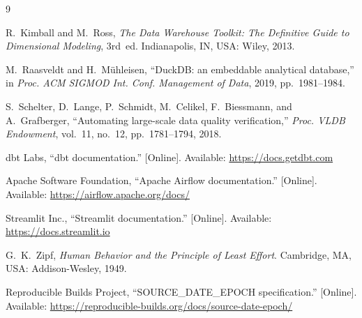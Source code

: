 \documentclass[conference]{IEEEtran}
\begin{document}
\begin{thebibliography}{9}

R.~Kimball and M.~Ross, \emph{The Data Warehouse Toolkit: The Definitive Guide
to Dimensional Modeling}, 3rd~ed. Indianapolis, IN, USA: Wiley, 2013.

M.~Raasveldt and H.~M\"{u}hleisen, ``DuckDB: an embeddable analytical
database,'' in \emph{Proc. ACM SIGMOD Int. Conf. Management of Data}, 2019,
pp.~1981--1984.

S.~Schelter, D.~Lange, P.~Schmidt, M.~Celikel, F.~Biessmann, and A.~Grafberger,
``Automating large-scale data quality verification,'' \emph{Proc. VLDB
Endowment}, vol.~11, no.~12, pp.~1781--1794, 2018.

dbt Labs, ``dbt documentation.'' [Online]. Available:
\url{https://docs.getdbt.com}

Apache Software Foundation, ``Apache Airflow documentation.'' [Online].
Available: \url{https://airflow.apache.org/docs/}

Streamlit Inc., ``Streamlit documentation.'' [Online]. Available:
\url{https://docs.streamlit.io}

G.~K.~Zipf, \emph{Human Behavior and the Principle of Least Effort}. Cambridge,
MA, USA: Addison-Wesley, 1949.

Reproducible Builds Project, ``SOURCE\_DATE\_EPOCH specification.'' [Online].
Available: \url{https://reproducible-builds.org/docs/source-date-epoch/}

\end{thebibliography}
\end{document}

